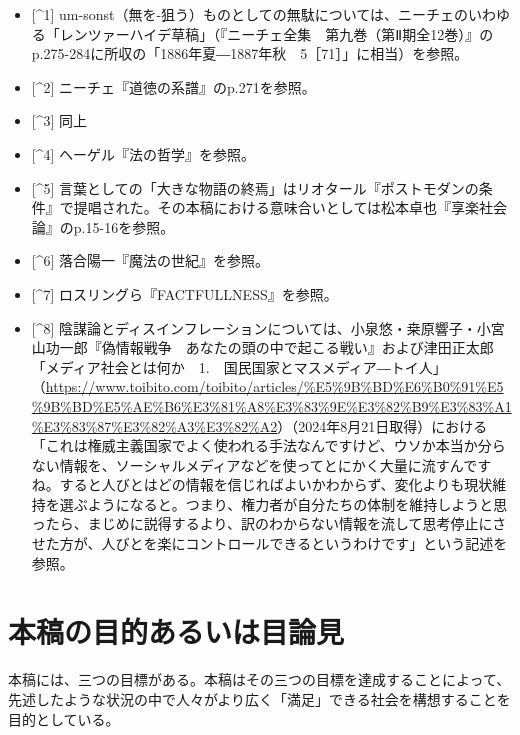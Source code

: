 \documentclass[8pt, a5paper]{ltjsarticle}
\providecommand{\tightlist}{%
  \setlength{\itemsep}{0pt}\setlength{\parskip}{0pt}}
\begin{document}
\begin{itemize}
\tightlist
\item
  {[}\^{}1{]}
  um-sonst（無を-狙う）ものとしての無駄については、ニーチェのいわゆる「レンツァーハイデ草稿」（『ニーチェ全集　第九巻（第Ⅱ期全12巻）』のp.275-284に所収の「1886年夏―1887年秋　5［71］」に相当）を参照。
\item
  {[}\^{}2{]} ニーチェ『道徳の系譜』のp.271を参照。
\item
  {[}\^{}3{]} 同上
\item
  {[}\^{}4{]} ヘーゲル『法の哲学』を参照。
\item
  {[}\^{}5{]}
  言葉としての「大きな物語の終焉」はリオタール『ポストモダンの条件』で提唱された。その本稿における意味合いとしては松本卓也『享楽社会論』のp.15-16を参照。
\item
  {[}\^{}6{]} 落合陽一『魔法の世紀』を参照。
\item
  {[}\^{}7{]} ロスリングら『FACTFULLNESS』を参照。
\item
  {[}\^{}8{]}
  陰謀論とディスインフレーションについては、小泉悠・桒原響子・小宮山功一郎『偽情報戦争　あなたの頭の中で起こる戦い』および津田正太郎「メディア社会とは何か　1.　国民国家とマスメディア―トイ人」（\url{https://www.toibito.com/toibito/articles/\%E5\%9B\%BD\%E6\%B0\%91\%E5\%9B\%BD\%E5\%AE\%B6\%E3\%81\%A8\%E3\%83\%9E\%E3\%82\%B9\%E3\%83\%A1\%E3\%83\%87\%E3\%82\%A3\%E3\%82\%A2}）（2024年8月21日取得）における「これは権威主義国家でよく使われる手法なんですけど、ウソか本当か分らない情報を、ソーシャルメディアなどを使ってとにかく大量に流すんですね。すると人びとはどの情報を信じればよいかわからず、変化よりも現状維持を選ぶようになると。つまり、権力者が自分たちの体制を維持しようと思ったら、まじめに説得するより、訳のわからない情報を流して思考停止にさせた方が、人びとを楽にコントロールできるというわけです」という記述を参照。
\end{itemize}

\section{本稿の目的あるいは目論見}\label{ux672cux7a3fux306eux76eeux7684ux3042ux308bux3044ux306fux76eeux8ad6ux898b}

本稿には、三つの目標がある。本稿はその三つの目標を達成することによって、先述したような状況の中で人々がより広く「満足」できる社会を構想することを目的としている。
\end{document}
